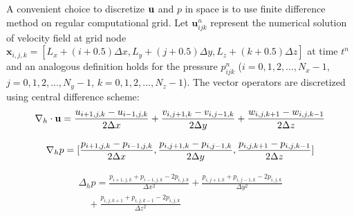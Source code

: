A convenient choice to discretize $\mathbf{u}$ and $p$ in space is to use finite difference method on regular computational grid. Let $\mathbf{u}^n_{ijk}$ represent the
numerical solution of velocity field at grid node  $\mathbf{x}_{i,j,k} =
[L_x+(i+0.5)\Delta x,L_y+(j+0.5)\Delta y, L_z+(k+0.5)\Delta z]$ at time $t^n$ 
and an analogous definition holds for the pressure $p^n_{ijk}$ ($i =
0,1,2,...,N_x-1$, $j = 0,1,2,...,N_y-1$, $k = 0,1,2,...,N_z-1$). The vector operators are discretized using central difference scheme:
\begin{equation} 
\nabla_h\cdot \mathbf{u} =
\frac{u_{i+1,j,k}-u_{i-1,j,k}}{2\Delta x} +
\frac{v_{i,j+1,k}-v_{i,j-1,k}}{2\Delta y} +
\frac{w_{i,j,k+1}-w_{i,j,k-1}}{2\Delta z}
\end{equation}

\begin{equation}
\nabla_h p =
[\frac{p_{i+1,j,k}-p_{i-1,j,k}}{2\Delta x},
\frac{p_{i,j+1,k}-p_{i,j-1,k}}{2\Delta y},
\frac{p_{i,j,k+1}-p_{i,j,k-1}}{2\Delta z}]\\    
\end{equation}

\begin{multline}
\Delta_h p = \frac{p_{i+1,j,k}+p_{i-1,j,k}-2p_{i,j,k}}{\Delta x^2} +
\frac{p_{i,j+1,k}+p_{i,j-1,k}-2p_{i,j,k}}{\Delta y^2} \\
 \quad +\frac{p_{i,j,k+1}+p_{i,j,k-1}-2p_{i,j,k}}{\Delta z^2} 
\end{multline}

